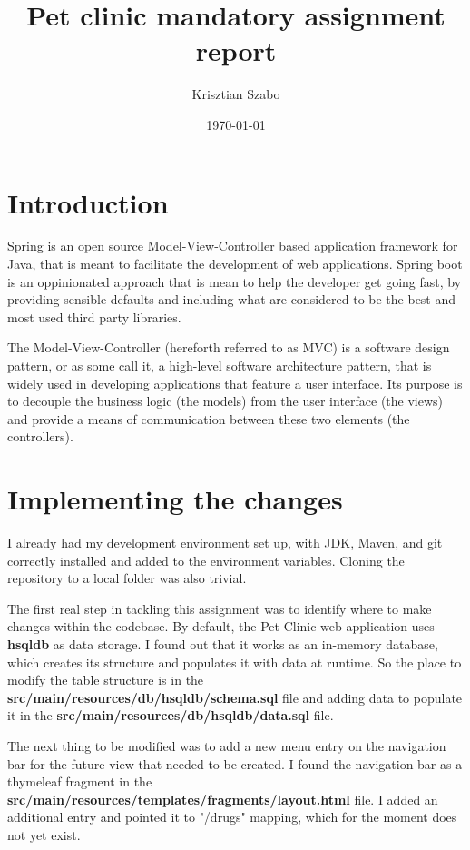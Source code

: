 \documentclass[12pt, a4paper]{article}
\title{Pet clinic mandatory assignment report}
\author{Krisztian Szabo}
\date{\today{}}
\begin{document}
\maketitle
{}
\newpage

\tableofcontents
{}
\newpage

\section{Introduction}
Spring is an open source Model-View-Controller based application framework for Java, that is meant to facilitate the development of web applications. Spring boot is an oppinionated approach that is mean to help the developer get going fast, by providing sensible defaults and including what are considered to be the best and most used third party libraries.

The Model-View-Controller (hereforth referred to as MVC) is a software design pattern, or as some call it, a high-level software architecture pattern, that is widely used in developing applications that feature a user interface. Its purpose is to decouple the business logic (the models) from the user interface (the views) and provide a means of communication between these two elements (the controllers).

\section{Implementing the changes}
I already had my development environment set up, with JDK, Maven, and git correctly installed and added to the environment variables. Cloning the repository to a local folder was also trivial.

The first real step in tackling this assignment was to identify where to make changes within the codebase. By default, the Pet Clinic web application uses \textbf{hsqldb} as data storage. I found out that it works as an in-memory database, which creates its structure and populates it with data at runtime. So the place to modify the table structure is in the \textbf{src/main/resources/db/hsqldb/schema.sql} file and adding data to populate it in the \textbf{src/main/resources/db/hsqldb/data.sql} file.

The next thing to be modified was to add a new menu entry on the navigation bar for the future view that needed to be created. I found the navigation bar as a thymeleaf fragment in the \textbf{src/main/resources/templates/fragments/layout.html} file. I added an additional entry and pointed it to "/drugs" mapping, which for the moment does not yet exist.
\end{document}
